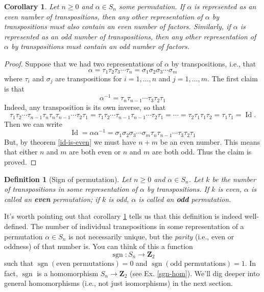 \documentclass[12pt]{article}
\numberwithin{equation}{subsection}
\newtheorem{defn}[subsection]{Definition}
\newtheorem{corollary}[subsection]{Corollary}
\theoremstyle{note}
\newcommand{\Id}{\operatorname{Id}}
\begin{document}
\begin{corollary} \label{sign-is-well-def}
	Let $n\geq 0$ and $\alpha\in S_n$ some permutation. If $\alpha$ is represented as an even number of transpositions, then any other representation of $\alpha$ by transpositions must also contain an even number of factors. Similarly, if $\alpha$ is represented as an odd number of transpositions, then any other representation of $\alpha$ by transpositions must contain an odd number of factors. 
\end{corollary}

\begin{proof}
	 Suppose that we had two representations of $\alpha$ by transpositions, i.e., that\[\alpha=\tau_1\tau_2\tau_3\cdots\tau_n=\sigma_1\sigma_2\sigma_3\cdots\sigma_m\] where $\tau_i$ and $\sigma_j$ are transpositions for $i=1,\dots,n$ and $j=1,\dots,m$. The first claim is that \[ \alpha^{-1}=\tau_n \tau_{n-1}\cdots \tau_3\tau_2\tau_1\] Indeed, any transposition is its own inverse, so that \[\tau_1\tau_2\cdots\tau_{n-1}\tau_n\tau_n\tau_{n-1}\cdots\tau_2\tau_1=\tau_1\tau_2\cdots\tau_{n-1}\tau_{n-1}\cdots \tau_2\tau_1=\cdots=\tau_2\tau_1\tau_1\tau_2=\tau_1\tau_1=\Id.\] Then we can write \[ \Id=\alpha \alpha^{-1}=\sigma_1\sigma_2\sigma_3\cdots\sigma_m\tau_n \tau_{n-1}\cdots \tau_3\tau_2\tau_1\] But, by theorem \ref{id-is-even} we must have $n+m$ be an even number. This means that either $n$ and $m$ are both even or $n$ and $m$ are both odd. Thus the claim is proved. 
\end{proof}

\begin{defn}[Sign of permutation]
Let $n\geq 0$ and $\alpha\in S_n$. Let $k$ be the number of transpositions in some representation of $\alpha$ by transpositions. If $k$ is even, $\alpha$ is called an \textbf{even} permutation; if $k$ is odd, $\alpha$ is called an \textbf{odd} permutation.
\end{defn}

It's worth pointing out that corollary \ref{sign-is-well-def} tells us that this definition is indeed well-defined. The number of individual transpositions in some representation of a permutation $\alpha\in S_n$ is not necessarily unique, but the \textit{parity} (i.e., even or oddness) of that number is. You can think of this a function \begin{equation} \operatorname{sgn}\colon S_n \to \mathbf{Z}_2\end{equation} such that $\operatorname{sgn}( \text{even permutations})=0$ and $\operatorname{sgn}(\text{odd permutations})=1$. In fact, $\operatorname{sgn}$ is a homomorphism $S_n\to \mathbf{Z}_2$ (see Ex. \ref{sgn-hom}). We'll dig deeper into general homomorphisms (i.e., not just isomorphisms) in the next section. 
\end{document}

